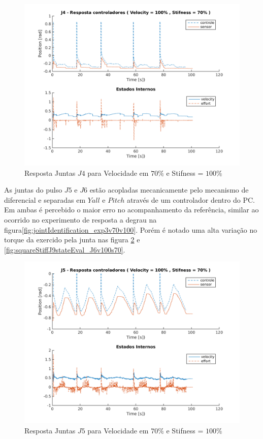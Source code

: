 \begin{figure}[H]
    \centering
    \includegraphics[width=0.6\linewidth,trim={2cm 1cm 2cm 2cm}]{tex/figs/squareStiffJ9stateEval_J4v100s70.png}
    \caption{Resposta Juntas $J4$ para Velocidade em $70\%$ e Stifness = $100\%$ }
    \label{fig:squareStiffJ9stateEval_J4v100s70}
\end{figure}

As juntas do pulso $J5$ e $J6$ estão acopladas mecanicamente pelo mecanismo de diferencial e separadas em $Yall$ e $Pitch$ através de um controlador dentro do PC. Em ambas é percebido o maior erro no acompanhamento da referência, similar ao ocorrido no experimento de resposta a degrau na figura\ref{fig:jointIdentification_exp3v70v100}. Porém é notado uma alta variação no torque da exercido pela junta nas figura \ref{fig:squareStiffJ9stateEval_J5v100s70} e \ref{fig:squareStiffJ9stateEval_J6v100s70}.

\vspace{1cm}

\begin{figure}[H]
    \centering
    \includegraphics[width=0.6\linewidth,trim={2cm 1cm 2cm 2cm}]{tex/figs/squareStiffJ9stateEval_J5v100s70.png}
    \caption{Resposta Juntas $J5$ para Velocidade em $70\%$ e Stifness = $100\%$ }
    \label{fig:squareStiffJ9stateEval_J5v100s70}
\end{figure}

